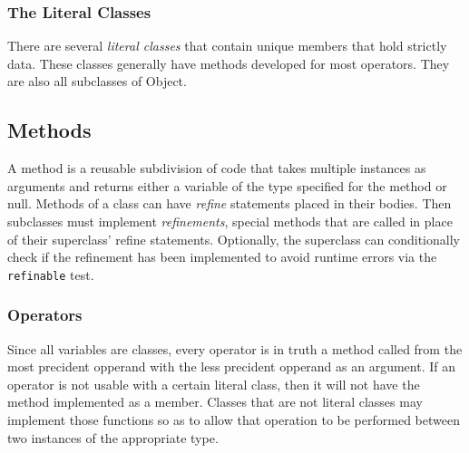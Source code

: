 \subsubsection{The Literal Classes}
There are several \textit{literal classes} that contain unique members that hold strictly data. These classes generally have methods developed for most operators. They are also all subclasses of Object.

\subsection{Methods}
A method is a reusable subdivision of code that takes multiple instances as arguments and returns either a variable of the type specified for the method or null. Methods of a class can have \textit{refine} statements placed in their bodies. Then subclasses must implement \textit{refinements}, special methods that are called in place of their superclass' refine statements. Optionally, the superclass can conditionally check if the refinement has been implemented to avoid runtime errors via the \verb!refinable! test.

\subsubsection{Operators}
Since all variables are classes, every operator is in truth a method called from the most precident opperand with the less precident opperand as an argument. If an operator is not usable with a certain literal class, then it will not have the method implemented as a member. Classes that are not literal classes may implement those functions so as to allow that operation to be performed between two instances of the appropriate type.
